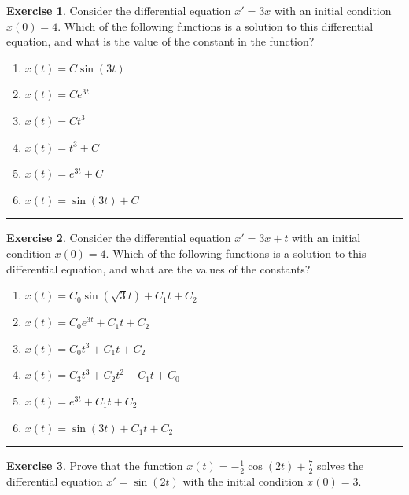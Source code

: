 \documentclass[
]{book}
\providecommand{\tightlist}{%
  \setlength{\itemsep}{0pt}\setlength{\parskip}{0pt}}
\theoremstyle{definition}
\theoremstyle{definition}
\theoremstyle{definition}
\newtheorem{exercise}{Exercise}[chapter]
\theoremstyle{remark}
\begin{document}
\begin{exercise}
\protect\hypertarget{exr:unnamed-chunk-415}{}{\label{exr:unnamed-chunk-415} }Consider the differential equation \(x' = 3x\) with an initial condition \(x(0) = 4\). Which of the following functions is a solution to this differential equation, and what is the value of the constant in the function?

\begin{enumerate}
\def\labelenumi{\alph{enumi}.}
\tightlist
\item
  \(x(t) = C \sin(3 t)\)
\item
  \(x(t) = C e^{3t}\)
\item
  \(x(t) = C t^3\)
\item
  \(x(t) = t^3 + C\)
\item
  \(x(t) = e^{3t} + C\)
\item
  \(x(t) = \sin(3t) + C\)
\end{enumerate}
\end{exercise}

\begin{center}\rule{0.5\linewidth}{0.5pt}\end{center}

\begin{exercise}
\protect\hypertarget{exr:unnamed-chunk-416}{}{\label{exr:unnamed-chunk-416} }Consider the differential equation \(x' = 3x + t\) with an initial condition \(x(0) = 4\). Which of the following functions is a solution to this differential equation, and what are the values of the constants?

\begin{enumerate}
\def\labelenumi{\alph{enumi}.}
\tightlist
\item
  \(x(t) = C_0 \sin(\sqrt{3} t) + C_1 t + C_2\)
\item
  \(x(t) = C_0 e^{3t} + C_1 t + C_2\)
\item
  \(x(t) = C_0 t^3 + C_1 t + C_2\)
\item
  \(x(t) = C_3 t^3 + C_2 t^2 + C_1 t + C_0\)
\item
  \(x(t) = e^{3t} + C_1 t + C_2\)
\item
  \(x(t) = \sin(3t) + C_1 t + C_2\)
\end{enumerate}
\end{exercise}

\begin{center}\rule{0.5\linewidth}{0.5pt}\end{center}

\begin{exercise}
\protect\hypertarget{exr:unnamed-chunk-417}{}{\label{exr:unnamed-chunk-417} }Prove that the function \(x(t) = -\frac{1}{2} \cos(2t) + \frac{7}{2}\) solves the differential equation \(x' = \sin(2t)\) with the initial condition \(x(0) =3\).
\end{exercise}
\end{document}

